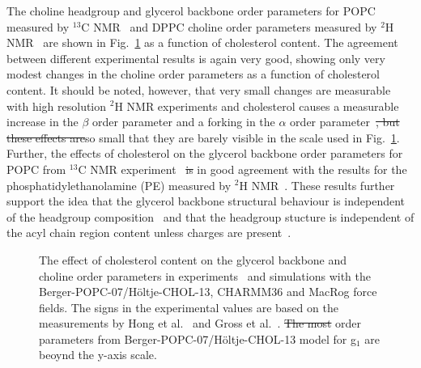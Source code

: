 \documentclass[pre,aps,floatfix,authordate1-4,twocolumn]{revtex4-1}
\providecommand{\DIFadd}[1]{{\protect\color{blue}\uwave{#1}}} %
\providecommand{\DIFdel}[1]{{\protect\color{red}\sout{#1}}}                      %
\providecommand{\DIFaddbegin}{} %
\providecommand{\DIFaddend}{} %
\providecommand{\DIFdelbegin}{} %
\providecommand{\DIFdelend}{} %
\providecommand{\DIFaddFL}[1]{\DIFadd{#1}} %
\providecommand{\DIFdelFL}[1]{\DIFdel{#1}} %
\providecommand{\DIFaddbeginFL}{} %
\providecommand{\DIFaddendFL}{} %
\providecommand{\DIFdelbeginFL}{} %
\providecommand{\DIFdelendFL}{} %
\begin{document}
The choline headgroup and glycerol backbone order parameters for POPC measured by $^{13}$C NMR~\cite{ferreira13} and DPPC choline order parameters 
measured by $^{2}$H NMR~\cite{brown78} are shown in Fig.~\ref{ordPchol} as a function of cholesterol content.
The agreement between different experimental results is again very good, showing only very modest changes in 
the choline order parameters as a function of cholesterol content. It should be noted, however, that very small
changes are measurable with high resolution $^{2}$H NMR experiments
and cholesterol causes a measurable increase in the $\beta$ order parameter and a forking in the $\alpha$ order
parameter~\cite{brown78}\DIFdelbegin \DIFdel{, but these effects are}\DIFdelend \DIFaddbegin \DIFadd{. These effects are, however, }\DIFaddend so small that they are barely visible in the scale used in Fig.~\ref{ordPchol}.
Further, the effects of cholesterol on the glycerol backbone order parameters for POPC from $^{13}$C NMR experiment~\cite{ferreira13} 
\DIFdelbegin \DIFdel{is }\DIFdelend \DIFaddbegin \DIFadd{are }\DIFaddend in good agreement with the results for the phosphatidylethanolamine (PE) measured by $^{2}$H NMR~\cite{ghosh82}.
These results further support the idea that the glycerol backbone structural behaviour is independent of the
headgroup composition~\cite{gally81} and that the headgroup stucture is independent of the acyl chain region content unless
charges are present~\cite{scherer87}.
\begin{figure}[]
  \centering
  \caption{\label{ordPchol}
    The effect of cholesterol content on the glycerol backbone and choline order parameters in experiments~\cite{brown78,ferreira13} and simulations
    with the Berger-POPC-07/H\"oltje-CHOL-13, CHARMM36 and MacRog force fields. The signs in the experimental values are based on the measurements by Hong et al.~\cite{hong95a,hong95b} 
    and Gross et al.~\cite{gross97}.  \DIFdelbeginFL \DIFdelFL{The most }\DIFdelendFL \DIFaddbeginFL \DIFaddFL{Most }\DIFaddendFL order parameters from Berger-POPC-07/H\"oltje-CHOL-13 model for g$_1$ are beoynd the y-axis scale.}
\end{figure}
\end{document}
